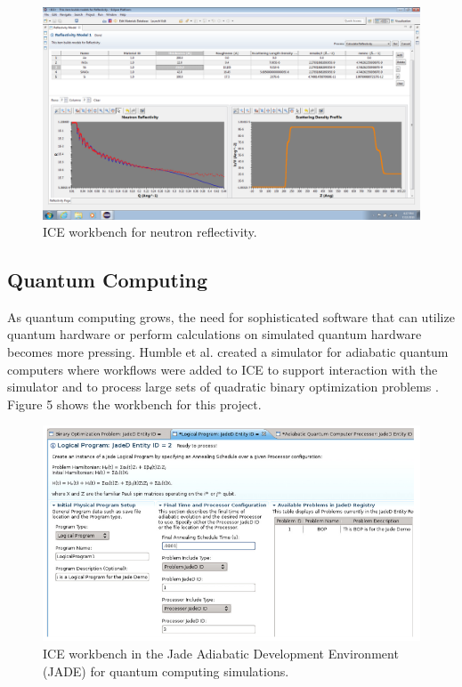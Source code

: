 \begin{figure}[H]
\centering
\includegraphics[width=\textwidth]{images/reflectivity-screenshot.png}
\caption{ICE workbench for neutron reflectivity.}
\end{figure}

\subsection{Quantum Computing}\label{quantum-computing}

As quantum computing grows, the need for sophisticated
software that can utilize quantum hardware or perform calculations on
simulated quantum hardware becomes more pressing. Humble et al. created a simulator for
adiabatic quantum computers where workflows were added to ICE to support
interaction with the simulator and to process large sets of
quadratic binary optimization problems \cite{humble_integrated_2014}. Figure 5
shows the workbench for this project.

\begin{figure}[H]
\centering
\includegraphics[width=\textwidth]{images/jaded.png}
\caption{ICE workbench in the Jade Adiabatic Development Environment (JADE) for quantum computing simulations.}
\end{figure}

